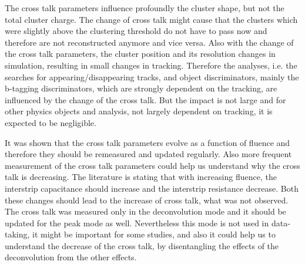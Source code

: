 
The cross talk parameters influence profoundly the cluster shape, but not the total cluster charge. The change of cross talk might cause that the clusters which were slightly above the clustering threshold do not have to pass now and therefore are not reconstructed anymore and vice versa. Also with the change of the cross talk parameters, the cluster position and its resolution changes in simulation, resulting in small changes in tracking. Therefore the analyses, i.e. the searches for appearing/disappearing tracks, and object discriminators, mainly the b-tagging discriminators, which are strongly dependent on the tracking, are influenced by the change of the cross talk. But the impact is not large and for other physics objects and analysis, not largely dependent on tracking, it is expected to be negligible.

It was shown that the cross talk parameters evolve as a function of fluence and therefore they should be remeasured and updated regularly. Also more frequent measurement of the cross talk parameters could help us understand why the cross talk is decreasing. The literature is stating that with increasing fluence, the interstrip capacitance should increase and the interstrip resistance decrease. Both these changes should lead to the increase of cross talk, what was not observed. The cross talk was measured only in the deconvolution mode and it should be  updated for the peak mode as well. Nevertheless this mode is not used in data-taking, it might be important for some studies, and also it could help us to understand the decrease of the cross talk, by disentangling the effects of the deconvolution from the other effects.

